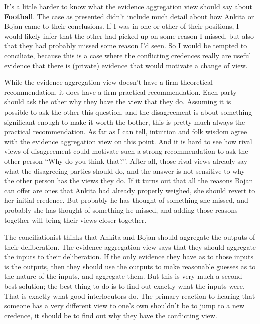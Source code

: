 It's a little harder to know what the evidence aggregation view should say about \textbf{Football}. The case as presented didn't include much detail about how \gls{Ankita} or \gls{Bojan} came to their conclusions. If I was in one or other of their positions, I would likely infer that the other had picked up on some reason I missed, but also that they had probably missed some reason I'd seen. So I would be tempted to conciliate, because this is a case where the conflicting credences really are useful evidence that there is (private) evidence that would motivate a change of view.

While the evidence aggregation view doesn't have a firm theoretical recommendation, it does have a firm practical recommendation. Each party should ask the other why they have the view that they do. Assuming it is possible to ask the other this question, and the disagreement is about something significant enough to make it worth the bother, this is pretty much always the practical recommendation. As far as I can tell, intuition and folk wisdom agree with the evidence aggregation view on this point. And it is hard to see how rival views of disagreement could motivate such a strong recommendation to ask the other person ``Why do you think that?''. After all, those rival views already say what the disagreeing parties should do, and the answer is not sensitive to why the other person has the views they do. If it turns out that all the reasons \gls{Bojan} can offer are ones that \gls{Ankita} had already properly weighed, she should revert to her initial credence. But probably he has thought of something she missed, and probably she has thought of something he missed, and adding those reasons together will bring their views closer together.

The conciliationist thinks that \gls{Ankita} and \gls{Bojan} should aggregate the outputs of their deliberation. The evidence aggregation view says that they should aggregate the inputs to their deliberation. If the only evidence they have as to those inputs is the outputs, then they should use the outputs to make reasonable guesses as to the nature of the inputs, and aggregate them. But this is very much a second-best solution; the best thing to do is to find out exactly what the inputs were. That is exactly what good interlocutors do. The primary reaction to hearing that someone has a very different view to one's own shouldn't be to jump to a new credence, it should be to find out why they have the conflicting view.

